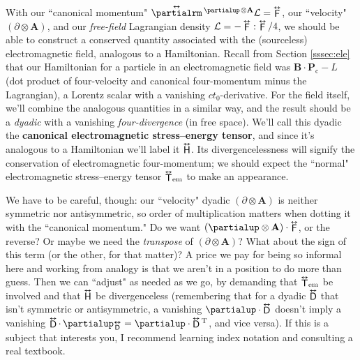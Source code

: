\documentclass[12pt]{article}
\renewcommand{\vv}[1]{\mathbf{#1}}
\newcommand{\tightoverset}[2]{%
  \mathop{#2}\limits^{\vbox to -.5ex{\kern-0.75ex\hbox{$#1$}\vss}}}
\newcommand{\inlinedy}[1]{\tightoverset{\text{\tiny$\bm\leftrightarrow$}}{#1}}
\newcommand{\fnoverset}[2]{%
  \mathop{#2}\limits^{\vbox to -.5ex{\kern-0.85ex\hbox{$#1$}\vss}}}
\newcommand{\footnotedy}[1]{\fnoverset{\text{\tiny$\bm\leftrightarrow$}}{#1}}
\begin{document}
With our ``canonical momentum" $\inlinedy{\partialrm} {}^{\partialup \mkern2mu \otimes \vv A} \mathcal{L} = \inlinedy{\mathsf{F}}$, our ``velocity" $( \partialup \otimes \vv A )$, and our \emph{free-field} Lagrangian density $\mathcal{L} = - \inlinedy{\mathsf{F}} : \inlinedy{\mathsf{F}} / 4$, we should be able to construct a conserved quantity associated with the (sourceless) electromagnetic field, analogous to a Hamiltonian. Recall from Section \ref{sssec:ele} that our Hamiltonian for a particle in an electromagnetic field was $\vv B \cdot \vv P_{\mathrm{c}} - L$ (dot product of four-velocity and canonical four-momentum minus the Lagrangian), a Lorentz scalar with a vanishing $ct_0$-derivative. For the field itself, we'll combine the analogous quantities in a similar way, and the result should be a \emph{dyadic} with a vanishing \emph{four-divergence} (in free space). We'll call this dyadic the \textbf{canonical electromagnetic stress--energy tensor}, and since it's analogous to a Hamiltonian we'll label it $\inlinedy{\mathsf{H}}$. Its divergencelessness will signify the conservation of electromagnetic four-momentum; we should expect the ``normal" electromagnetic stress--energy tensor ${\inlinedy{\mathsf{T}}}_{\textrm{em}}$ to make an appearance.

We have to be careful, though: our ``velocity" dyadic $( \partialup \otimes \vv A )$ is neither symmetric nor antisymmetric, so order of multiplication matters when dotting it with the ``canonical momentum." Do we want $(\partialup \otimes \vv A) \cdot \inlinedy{\mathsf{F}}$, or the reverse? Or maybe we need the \emph{transpose} of $(\partialup \otimes \vv A)$? What about the sign of this term (or the other, for that matter)? A price we pay for being so informal here and working from analogy is that we aren't in a position to do more than guess. Then we can ``adjust" as needed as we go, by demanding that ${\inlinedy{\mathsf{T}}}_{\textrm{em}}$ be involved and that $\inlinedy{\mathsf{H}}$ be divergenceless (remembering that for a dyadic $\inlinedy{\mathsf{D}}$ that isn't symmetric or antisymmetric, a vanishing $\partialup \cdot \inlinedy{\mathsf{D}}$ doesn't imply a vanishing $\inlinedy{\mathsf{D}} \cdot \, \partialup _{\footnotedy{\mathsf{D}}} = \partialup \cdot \inlinedy{\mathsf{D}} {}^{\mathrm{T}} $, and vice versa). If this is a subject that interests you, I recommend learning index notation and consulting a real textbook.
\end{document}
